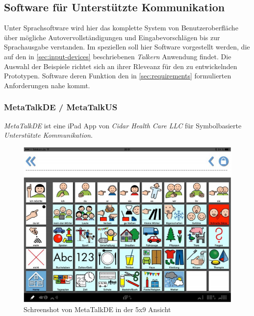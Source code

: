     \subsection{Software für Unterstützte Kommunikation}
    \label{sec:software-examples}
    
    	Unter Sprachsoftware wird hier das komplette System von Benutzeroberfläche über mögliche Autovervollständigungen und Eingabevorschlägen bis zur Sprachausgabe verstanden. Im speziellen soll hier Software vorgestellt werden, die auf den in \autoref{sec:input-devices} beschriebenen \emph{Talkern} Anwendung findet. Die Auswahl der Beispiele richtet sich an ihrer Rleveanz für den zu entwickelnden Prototypen. Software deren Funktion den in \autoref{sec:requirements} formulierten Anforderungen nahe kommt.
        
        \subsubsection*{MetaTalkDE / MetaTalkUS}
        	\emph{MetaTalkDE} ist eine iPad App von \emph{Cidar Health Care LLC} für Symbolbasierte \emph{Unterstützte Kommunikation}.
            
            \begin{figure}[H]
				\centering
				\includegraphics[width=.7\linewidth]{images/Metatalk.png}
                \caption{Schreenshot von MetaTalkDE in der 5x9 Ansicht
                \parencite[S. 8]{cidar:metaTalkManual}}
				\label{fig:metatalk}
			\end{figure}
            
